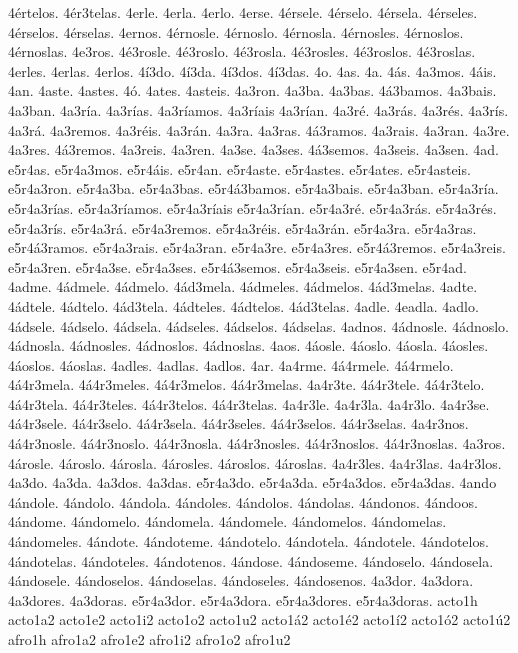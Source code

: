 {4értelos.
4ér3telas.
4erle.
4erla.
4erlo.
4erse.
4érsele.
4érselo.
4érsela.
4érseles.
4érselos.
4érselas.
4ernos.
4érnosle.
4érnoslo.
4érnosla.
4érnosles.
4érnoslos.
4érnoslas.
4e3ros.
4é3rosle.
4é3roslo.
4é3rosla.
4é3rosles.
4é3roslos.
4é3roslas.
4erles.
4erlas.
4erlos.
4í3do.
4í3da.
4í3dos.
4í3das.
4o.
4as.
4a.
4ás.
4a3mos.
4áis.
4an.
4aste.
4astes.
4ó.
4ates.
4asteis.
4a3ron.
4a3ba.
4a3bas.
4á3bamos.
4a3bais.
4a3ban.
4a3ría.
4a3rías.
4a3ríamos.
4a3ríais
4a3rían.
4a3ré.
4a3rás.
4a3rés.
4a3rís.
4a3rá.
4a3remos.
4a3réis.
4a3rán.
4a3ra.
4a3ras.
4á3ramos.
4a3rais.
4a3ran.
4a3re.
4a3res.
4á3remos.
4a3reis.
4a3ren.
4a3se.
4a3ses.
4á3semos.
4a3seis.
4a3sen.
4ad.
e5r4as.
e5r4a3mos.
e5r4áis.
e5r4an.
e5r4aste.
e5r4astes.
e5r4ates.
e5r4asteis.
e5r4a3ron.
e5r4a3ba.
e5r4a3bas.
e5r4á3bamos.
e5r4a3bais.
e5r4a3ban.
e5r4a3ría.
e5r4a3rías.
e5r4a3ríamos.
e5r4a3ríais
e5r4a3rían.
e5r4a3ré.
e5r4a3rás.
e5r4a3rés.
e5r4a3rís.
e5r4a3rá.
e5r4a3remos.
e5r4a3réis.
e5r4a3rán.
e5r4a3ra.
e5r4a3ras.
e5r4á3ramos.
e5r4a3rais.
e5r4a3ran.
e5r4a3re.
e5r4a3res.
e5r4á3remos.
e5r4a3reis.
e5r4a3ren.
e5r4a3se.
e5r4a3ses.
e5r4á3semos.
e5r4a3seis.
e5r4a3sen.
e5r4ad.
4adme.
4ádmele.
4ádmelo.
4ád3mela.
4ádmeles.
4ádmelos.
4ád3melas.
4adte.
4ádtele.
4ádtelo.
4ád3tela.
4ádteles.
4ádtelos.
4ád3telas.
4adle.
4eadla.
4adlo.
4ádsele.
4ádselo.
4ádsela.
4ádseles.
4ádselos.
4ádselas.
4adnos.
4ádnosle.
4ádnoslo.
4ádnosla.
4ádnosles.
4ádnoslos.
4ádnoslas.
4aos.
4áosle.
4áoslo.
4áosla.
4áosles.
4áoslos.
4áoslas.
4adles.
4adlas.
4adlos.
4ar.
4a4rme.
4á4rmele.
4á4rmelo.
4á4r3mela.
4á4r3meles.
4á4r3melos.
4á4r3melas.
4a4r3te.
4á4r3tele.
4á4r3telo.
4á4r3tela.
4á4r3teles.
4á4r3telos.
4á4r3telas.
4a4r3le.
4a4r3la.
4a4r3lo.
4a4r3se.
4á4r3sele.
4á4r3selo.
4á4r3sela.
4á4r3seles.
4á4r3selos.
4á4r3selas.
4a4r3nos.
4á4r3nosle.
4á4r3noslo.
4á4r3nosla.
4á4r3nosles.
4á4r3noslos.
4á4r3noslas.
4a3ros.
4árosle.
4ároslo.
4árosla.
4árosles.
4ároslos.
4ároslas.
4a4r3les.
4a4r3las.
4a4r3los.
4a3do.
4a3da.
4a3dos.
4a3das.
e5r4a3do.
e5r4a3da.
e5r4a3dos.
e5r4a3das.
4ando
4ándole.
4ándolo.
4ándola.
4ándoles.
4ándolos.
4ándolas.
4ándonos.
4ándoos.
4ándome.
4ándomelo.
4ándomela.
4ándomele.
4ándomelos.
4ándomelas.
4ándomeles.
4ándote.
4ándoteme.
4ándotelo.
4ándotela.
4ándotele.
4ándotelos.
4ándotelas.
4ándoteles.
4ándotenos.
4ándose.
4ándoseme.
4ándoselo.
4ándosela.
4ándosele.
4ándoselos.
4ándoselas.
4ándoseles.
4ándosenos.
4a3dor.
4a3dora.
4a3dores.
4a3doras.
e5r4a3dor.
e5r4a3dora.
e5r4a3dores.
e5r4a3doras.
acto1h
acto1a2 acto1e2 acto1i2 acto1o2 acto1u2
acto1á2 acto1é2 acto1í2 acto1ó2 acto1ú2
afro1h
afro1a2 afro1e2 afro1i2 afro1o2 afro1u2
}
